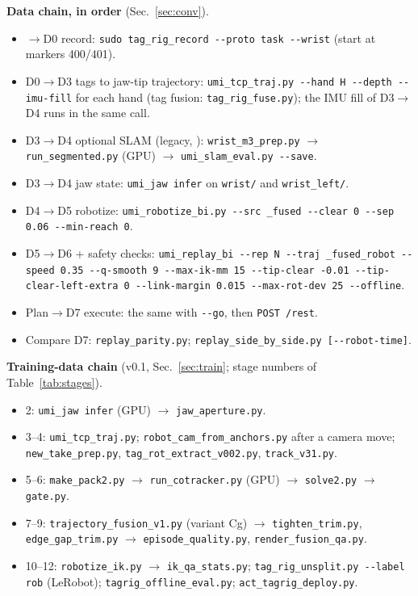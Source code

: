 \documentclass[conference,10pt]{IEEEtran}
\begin{document}
\noindent\textbf{Data chain, in order} (Sec.~\ref{sec:conv}).
\begin{itemize}
\item $\to$D0 record: \texttt{sudo tag\_rig\_record -{}-proto task -{}-wrist} (start at markers 400/401).
\item D0$\to$D3 tags to jaw-tip trajectory: \texttt{umi\_tcp\_traj.py -{}-hand H -{}-depth -{}-imu-fill} for each hand
  (tag fusion: \texttt{tag\_rig\_fuse.py}); the IMU fill of D3$\to$D4 runs in the same call.
\item D3$\to$D4 optional SLAM (legacy, ): \texttt{wrist\_m3\_prep.py} $\to$
  \texttt{run\_segmented.py} (GPU) $\to$ \texttt{umi\_slam\_eval.py -{}-save}.
\item D3$\to$D4 jaw state: \texttt{umi\_jaw infer} on \texttt{wrist/} and \texttt{wrist\_left/}.
\item D4$\to$D5 robotize: \texttt{umi\_robotize\_bi.py -{}-src \_fused -{}-clear 0 -{}-sep 0.06 -{}-min-reach 0}.
\item D5$\to$D6 + safety checks: \texttt{umi\_replay\_bi -{}-rep N -{}-traj \_fused\_robot -{}-speed 0.35 -{}-q-smooth 9
  -{}-max-ik-mm 15 -{}-tip-clear -0.01 -{}-tip-clear-left-extra 0 -{}-link-margin 0.015 -{}-max-rot-dev 25 -{}-offline}.
\item Plan$\to$D7 execute: the same with \texttt{-{}-go}, then \texttt{POST /rest}.
\item Compare D7: \texttt{replay\_parity.py}; \texttt{replay\_side\_by\_side.py [-{}-robot-time]}.
\end{itemize}

\noindent\textbf{Training-data chain} (v0.1, Sec.~\ref{sec:train}; stage numbers of Table~\ref{tab:stages}).
\begin{itemize}
\item 2: \texttt{umi\_jaw infer} (GPU) $\to$ \texttt{jaw\_aperture.py}.
\item 3--4: \texttt{umi\_tcp\_traj.py}; \texttt{robot\_cam\_from\_anchors.py} after a camera move; \texttt{new\_take\_prep.py},
  \texttt{tag\_rot\_extract\_v002.py}, \texttt{track\_v31.py}.
\item 5--6: \texttt{make\_pack2.py} $\to$ \texttt{run\_cotracker.py} (GPU) $\to$ \texttt{solve2.py} $\to$ \texttt{gate.py}.
\item 7--9: \texttt{trajectory\_fusion\_v1.py} (variant Cg) $\to$ \texttt{tighten\_trim.py}, \texttt{edge\_gap\_trim.py} $\to$
  \texttt{episode\_quality.py}, \texttt{render\_fusion\_qa.py}.
\item 10--12: \texttt{robotize\_ik.py} $\to$ \texttt{ik\_qa\_stats.py}; \texttt{tag\_rig\_unsplit.py -{}-label rob}
  (LeRobot); \texttt{tagrig\_offline\_eval.py}; \texttt{act\_tagrig\_deploy.py}.
\end{itemize}
\end{document}
